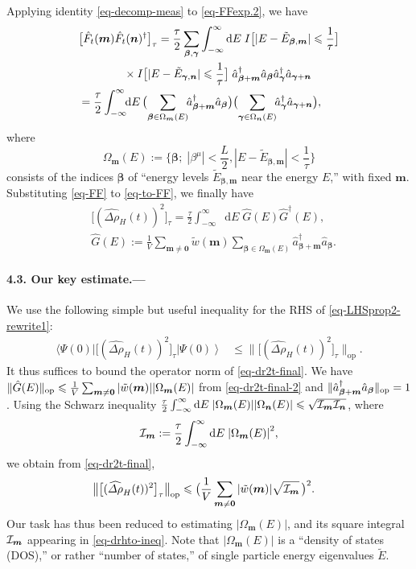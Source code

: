\documentclass[aps,prl,superscriptaddress,reprint]{revtex4-2}
\newcommand{\se}[1]{\paragraph{#1.---}}
\newcommand*{\dd}{\mathop{}\!\mathrm{d}}
\theoremstyle{definition}
\newcommand{\abs}[1]{{\left\vert #1 \right\vert}}
\newcommand{\nabs}[1]{{| #1 |}}
\newcommand{\bigparen}[1]{\bigl({#1}\bigr)}
\newcommand{\bigbrac}[1]{\bigl\{{#1}\bigr\}}
\newcommand{\bigbrak}[1]{\bigl[{#1}\bigr]}
\newcommand{\nn}{\notag \\ }
\newcommand{\II}{{\cal I}}
\newcommand{\ket}[1]{\left|{#1}\right\rangle}
\newcommand{\bra}[1]{\langle{#1}|}
\newcommand{\sw}[2]{\bra{#1}{#2}\ket{#1}}
\newcommand{\ti}{\tilde}
\newcommand{\ha}{\hat}
\newcommand{\wh}{\widehat}
\newcommand{\da}[1]{#1^\dag}
\newcommand{\ta}{\tau}
\renewcommand{\b}{\beta}
\renewcommand{\c}{\gamma}
\newcommand{\De}{\varDelta}
\newcommand{\m}{\mu}
\newcommand{\Om}{\Omega}
\renewcommand{\r}{\rho}
\newcommand{\f}{\frac}
\newcommand{\qq}{\qquad}
\newcommand{\ve}[1]{\boldsymbol{#1}}
\newcommand{\bignormop}[1]{\bigl\|#1\bigr\|_{\mathrm{op}}}
\newcommand{\nnormop}[1]{\|#1\|\sbt{op}}
\renewcommand{\le}{\leqslant}
\newcommand{\sbt}[1]{_{\text{\textrm{#1}}}}
\newcommand{\intinf}{\int_{-\infty}^\infty}
\newcommand{\bb}{{\ve \b}}
\newcommand{\cc}{{\ve \c}}
\newcommand{\mm}{{\ve m}}
\newcommand{\zz}{{\ve 0}}
\begin{document}
Applying identity \eqref{eq-decomp-meas} to \eqref{eq-FFexp.2}, we have
\begin{align}
  	&\bigbrak{ \ha F_t(\mm)\ha F_t(\ve n)^\dagger }_\ta
    =
    \f\ta2
    \sum_{\bb,\cc}
    \intinf \dd E\;
  	I\bigbrak{\nabs{E-\ti E_{\bb,\mm}}\le\f1\ta}
    \nn
    &\qq \qq\times
 	I\bigbrak{\nabs{E-\ti E_{\cc,\ve n}}\le\f1\ta}\;
  	\da {\ha a}_{\bb+\mm} {\ha a}_{\bb} \da {\ha a}_{\cc} {\ha a}_{\cc+\ve n}
    \nonumber \\
    & =
    \f\ta2
    \intinf \!\! \dd E\,
    \bigparen{ \sum_{\bb\in\Om_\mm(E)} \!\!
    \da {\ha a}_{\bb+\mm} {\ha a}_{\bb} }
    \bigparen{ \sum_{\cc\in\Om_{\ve n}(E)} \!\!
    \da {\ha a}_{\cc} {\ha a}_{\cc+\ve n} },
    \label{eq-FF}
\end{align}
where
\begin{equation}
	\Om_{\mm}(E):=\bigbrac{\bb; \;
  	\abs{\b^\m}<\f L2,
  	\nabs{ E-\ti E_{\bb,\mm} }<\f1\ta}
  	\label{eq-Omega-def}
\end{equation}
consists of the indices $\bb$ of ``energy levels
$\ti E_{\bb,\mm}$
near the energy $E$,'' with fixed $\mm$.
Substituting \eqref{eq-FF} to \eqref{eq-to-FF}, we finally have
\begin{align}
  	&
  	\bigbrak{ (\wh{\De\r}_H(t))^2 }_\ta
  	=
  	\f\ta2
    \intinf\dd E\;
    \ha G(E)\da{\ha G}(E),
    \label{eq-dr2t-final}
    \\
    &\hat{G}(E):=
    \f1V
    \sum_{\mm\ne\zz} \ti w(\mm)
    \sum_{\bb\in\Om_\mm(E)}
    \da {\ha a}_{\bb+\mm} {\ha a}_{\bb} .
    \label{eq-dr2t-final-2}
\end{align}


\se{4.3. Our key estimate}

We use the following simple but useful inequality for
the RHS of \eqref{eq-LHSprop2-rewrite1}:
\begin{align}
  	\sw{\Psi(0)}
  	{\bigbrak{ (\wh{\De\r}_H(t))^2 }_\ta}
  	& \le
  	\bignormop{\bigbrak{ (\wh{\De\r}_H(t))^2 }_\ta}.
  	\label{eq-drt-le-drhto}
\end{align}
It thus suffices to bound the operator norm of \eqref{eq-dr2t-final}.
We have
$\| \hat{G}(E) \|_{\rm op} \le \f1V \sum_{\mm\ne\zz} \abs{\ti w(\mm)} \abs{\Om_\mm(E)}
$
from \eqref{eq-dr2t-final-2} and
$\nnormop{\da {\ha a}_{\bb+\mm} {\ha a}_{\bb}} =1$.
Using the Schwarz inequality
$\f\ta{2}\intinf\dd E\;
\abs{\Om_\mm(E)}
\abs{\Om_{\ve n}(E)}
\le \sqrt{\II_\mm \II_{\ve n}}$,
where
\begin{equation}
	\II_\mm:=
	\f\ta{2}
	\intinf\dd E\;
	\abs{\Om_\mm(E)}^2
	,
	\label{eq-IIdef.11}
\end{equation}
we obtain from \eqref{eq-dr2t-final},
\begin{align}
  	\bignormop{\bigbrak{ (\wh{\De\r}_H(t))^2 }_\ta}
  	&\le
  	\bigl ( \f1{V}
  	\sum_{\mm\ne\zz}
  	\abs{ \ti w(\mm) }
    \sqrt{\II_\mm} \, \bigr )^2
    .
 	\label{eq-drhto-ineq}
\end{align}
Our task has thus been reduced to estimating
$\abs{\Om_\mm(E)}$, and its square integral $\II_\mm$
appearing in \eqref{eq-drhto-ineq}.
Note that $\abs{\Om_\mm(E)}$ is a ``density of states (DOS),''
or rather ``number of states,''
of single particle energy eigenvalues $\tilde{E}$.
\end{document}
